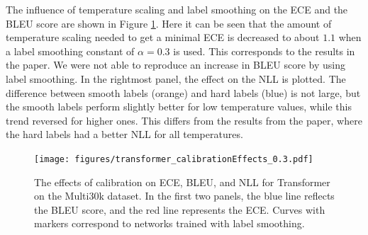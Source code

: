 The influence of temperature scaling and label smoothing on the ECE and the BLEU score are shown in Figure \ref{fig:cal_effect_transformer}. Here it can be seen that the amount of temperature scaling needed to get a minimal ECE is decreased to about $1.1$ when a label smoothing constant of $\alpha = 0.3$ is used. This corresponds to the results in the paper. We were not able to reproduce an increase in BLEU score by using label smoothing. In the rightmost panel, the effect on the NLL is plotted. The difference between smooth labels (orange) and hard labels (blue) is not large, but the smooth labels perform slightly better for low temperature values, while this trend reversed for higher ones. This differs from the results from the paper, where the hard labels had a better NLL for all temperatures.

\begin{figure}[ht]
    \centering
    \texttt{[image: figures/transformer\_calibrationEffects\_0.3.pdf]}
    \caption{The effects of calibration on ECE, BLEU, and NLL for Transformer on the Multi30k dataset. In the first two panels, the blue line reflects the BLEU score, and the red line represents the ECE. Curves with markers correspond to networks trained with label smoothing.}
    \label{fig:cal_effect_transformer}
\end{figure}

